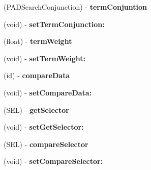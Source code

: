 \begin{DoxyCompactItemize}
\item 
\hypertarget{interface_p_a_d_search_term_a3a8d1d3d469d3d2ee59c49a354d9cddf}{
(PADSearchConjunction) -\/ {\bfseries termConjuntion}}
\label{interface_p_a_d_search_term_a3a8d1d3d469d3d2ee59c49a354d9cddf}

\item 
\hypertarget{interface_p_a_d_search_term_a15ec7b33f87789513eb5053259135dbb}{
(void) -\/ {\bfseries setTermConjunction:}}
\label{interface_p_a_d_search_term_a15ec7b33f87789513eb5053259135dbb}

\item 
\hypertarget{interface_p_a_d_search_term_a4d8ba86550e68f86b1f78390ed707196}{
(float) -\/ {\bfseries termWeight}}
\label{interface_p_a_d_search_term_a4d8ba86550e68f86b1f78390ed707196}

\item 
\hypertarget{interface_p_a_d_search_term_a850c3fdfb98e45412d19485fb83aff3d}{
(void) -\/ {\bfseries setTermWeight:}}
\label{interface_p_a_d_search_term_a850c3fdfb98e45412d19485fb83aff3d}

\item 
\hypertarget{interface_p_a_d_search_term_a0721b3c6a7cdf420351e3e343dc02dac}{
(id) -\/ {\bfseries compareData}}
\label{interface_p_a_d_search_term_a0721b3c6a7cdf420351e3e343dc02dac}

\item 
\hypertarget{interface_p_a_d_search_term_ad96c21423eeedb1093384036f582f8e4}{
(void) -\/ {\bfseries setCompareData:}}
\label{interface_p_a_d_search_term_ad96c21423eeedb1093384036f582f8e4}

\item 
\hypertarget{interface_p_a_d_search_term_a25da4ce44a6ee2ad7106cefae363a933}{
(SEL) -\/ {\bfseries getSelector}}
\label{interface_p_a_d_search_term_a25da4ce44a6ee2ad7106cefae363a933}

\item 
\hypertarget{interface_p_a_d_search_term_a55c7a56de1e408f07eba7386def11b11}{
(void) -\/ {\bfseries setGetSelector:}}
\label{interface_p_a_d_search_term_a55c7a56de1e408f07eba7386def11b11}

\item 
\hypertarget{interface_p_a_d_search_term_a9750954083a47b40f328daf1bace7e6b}{
(SEL) -\/ {\bfseries compareSelector}}
\label{interface_p_a_d_search_term_a9750954083a47b40f328daf1bace7e6b}

\item 
\hypertarget{interface_p_a_d_search_term_a2c3a69ebff731f6fe86a614a7731c29b}{
(void) -\/ {\bfseries setCompareSelector:}}
\label{interface_p_a_d_search_term_a2c3a69ebff731f6fe86a614a7731c29b}


\end{DoxyCompactItemize}
